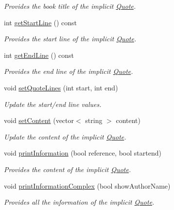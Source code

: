 \begin{DoxyCompactItemize}
\begin{DoxyCompactList}\small\item\em Provides the book title of the implicit \hyperlink{class_quote}{Quote}. \end{DoxyCompactList}\item 
int \hyperlink{class_quote_abec5ea5330c351afab5a5a0be5c5b7fa}{get\+Start\+Line} () const 
\begin{DoxyCompactList}\small\item\em Provides the start line of the implicit \hyperlink{class_quote}{Quote}. \end{DoxyCompactList}\item 
int \hyperlink{class_quote_aec85eae85f33b6e10458821f54f28fc9}{get\+End\+Line} () const 
\begin{DoxyCompactList}\small\item\em Provides the end line of the implicit \hyperlink{class_quote}{Quote}. \end{DoxyCompactList}\item 
void \hyperlink{class_quote_a211e2593b1ef18dc7fd4a5da87384fa1}{set\+Quote\+Lines} (int start, int end)
\begin{DoxyCompactList}\small\item\em Update the start/end line values. \end{DoxyCompactList}\item 
void \hyperlink{class_quote_ab3af36f8b5649b115fca7eecbb294a59}{set\+Content} (vector$<$ string $>$ content)
\begin{DoxyCompactList}\small\item\em Update the content of the implicit \hyperlink{class_quote}{Quote}. \end{DoxyCompactList}\item 
void \hyperlink{class_quote_a0854af3d11ff805991e87ef6e9bebf69}{print\+Information} (bool reference, bool startend)
\begin{DoxyCompactList}\small\item\em Provides the content of the implicit \hyperlink{class_quote}{Quote}. \end{DoxyCompactList}\item 
void \hyperlink{class_quote_a60148444a9f56241ce8526a44f5baf1c}{print\+Information\+Complex} (bool show\+Author\+Name)
\begin{DoxyCompactList}\small\item\em Provides all the information of the implicit \hyperlink{class_quote}{Quote}. \end{DoxyCompactList}\end{DoxyCompactItemize}
